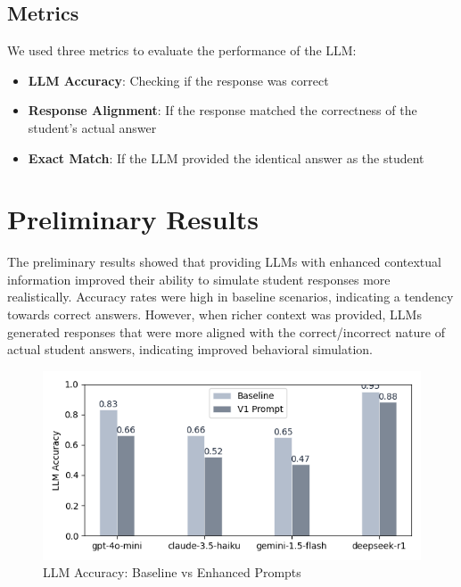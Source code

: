 \documentclass[
    a4paper, %
    10pt, %
    twoside %
]{LTJournalArticle}
\begin{document}
\subsection{Metrics}
We used three metrics to evaluate the performance of the LLM:
\begin{itemize}
    \item \textbf{LLM Accuracy}: Checking if the response was correct
    \item \textbf{Response Alignment}: If the response matched the correctness of the student's actual answer
    \item \textbf{Exact Match}: If the LLM provided the identical answer as the student
\end{itemize}

\section{Preliminary Results}

The preliminary results showed that providing LLMs with enhanced contextual information improved their ability to simulate student responses more realistically. Accuracy rates were high in baseline scenarios, indicating a tendency towards correct answers. However, when richer context was provided, LLMs generated responses that were more aligned with the correct/incorrect nature of actual student answers, indicating improved behavioral simulation. 

\begin{figure}[H]
    \centering
    \includegraphics[width=\columnwidth]{../latex/images/llm_accuracy_comparison.png}
    \caption{LLM Accuracy: Baseline vs Enhanced Prompts}
    \label{fig:llm-accuracy}
\end{figure}
\end{document}

